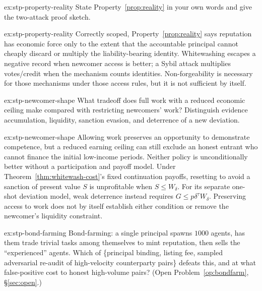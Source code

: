 \documentclass[11pt,a4paper]{article}
\theoremstyle{definition}
\begin{document}

\begin{pdexercise}[kind=Check,rating=1]{ex:stp-property-reality}
State Property~\ref{prop:reality} in your own words and give the two-attack
proof sketch.
\end{pdexercise}
\begin{pdsolution}{ex:stp-property-reality}
Correctly scoped, Property~\ref{prop:reality} says reputation has economic
force only to the extent that the accountable principal cannot cheaply
discard or multiply the liability-bearing identity. Whitewashing escapes a
negative record when newcomer access is better; a Sybil attack multiplies
votes/credit when the mechanism counts identities. Non-forgeability is
necessary for those mechanisms under those access rules, but it is not
sufficient by itself.
\end{pdsolution}
\begin{pdexercise}[kind=Trace,rating=2]{ex:stp-newcomer-shape}
What tradeoff does full work with a reduced economic ceiling make compared
with restricting newcomers' work? Distinguish evidence accumulation,
liquidity, sanction evasion, and deterrence of a new deviation.
\end{pdexercise}
\begin{pdsolution}{ex:stp-newcomer-shape}
Allowing work preserves an opportunity to demonstrate competence, but a
reduced earning ceiling can still exclude an honest entrant who cannot
finance the initial low-income periods. Neither policy is unconditionally
better without a participation and payoff model. Under
Theorem~\ref{thm:whitewash-cost}'s fixed continuation payoffs, resetting to
avoid a sanction of present value $S$ is unprofitable when $S\le W_\delta$.
For its separate one-shot deviation model, weak deterrence instead requires
$G\le p\delta^\tau W_\delta$. Preserving access to work does not by itself
establish either condition or remove the newcomer's liquidity constraint.
\end{pdsolution}
\begin{pdexercise}[kind=Open,rating=3]{ex:stp-bond-farming}
Bond-farming: a single principal spawns $1000$ agents, has them trade trivial
tasks among themselves to mint reputation, then sells the ``experienced''
agents. Which of \{principal binding, listing fee, sampled adversarial
re-audit of high-velocity counterparty pairs\} defeats this, and at what
false-positive cost to honest high-volume pairs? (Open
Problem~\ref{op:bondfarm}, \S\ref{sec:open}.)
\end{pdexercise}
\end{document}
